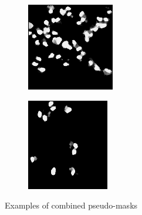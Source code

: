 \begin{figure}[H]
\begin{subfigure}[b]{0.24\textwidth}
  \end{subfigure}\hfill
  \begin{subfigure}[b]{0.24\textwidth}
    \centering
    \includegraphics[width=\linewidth]{assets/images/for_presentation/combined-3.png}
  \end{subfigure}
  \begin{subfigure}[b]{0.24\textwidth}
    \centering
    \includegraphics[width=\linewidth]{assets/images/for_presentation/combined-4.png}
  \end{subfigure}
  \caption{Examples of combined pseudo-masks}
  \label{fig:combined-vis}
\end{figure}

